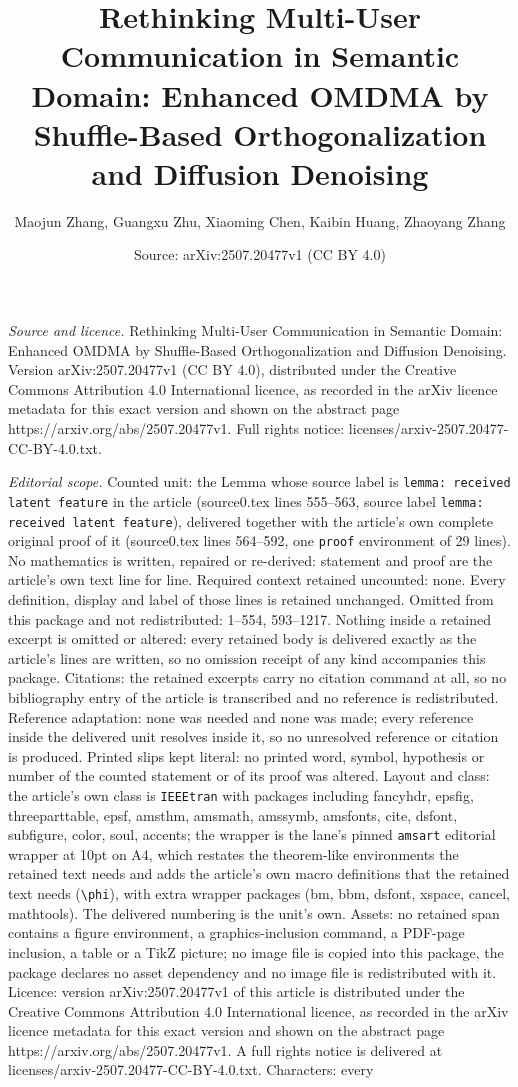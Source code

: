 \documentclass[10pt,a4paper]{amsart}
\title[Rethinking Multi-User Communication in Semantic Domain: Enha]{Rethinking Multi-User Communication in Semantic Domain: Enhanced OMDMA by Shuffle-Based Orthogonalization and Diffusion Denoising}
\author{Maojun Zhang, Guangxu Zhu, Xiaoming Chen, Kaibin Huang, Zhaoyang Zhang}
\date{Source: arXiv:2507.20477v1 (CC BY 4.0)}
\begin{document}
\maketitle

\noindent\emph{Source and licence.} Rethinking Multi-User Communication in Semantic Domain: Enhanced OMDMA by Shuffle-Based Orthogonalization and Diffusion Denoising. Version arXiv:2507.20477v1 (CC BY 4.0), distributed under the Creative Commons Attribution 4.0 International licence, as recorded in the arXiv licence metadata for this exact version and shown on the abstract page https://arxiv.org/abs/2507.20477v1. Full rights notice: licenses/arxiv-2507.20477-CC-BY-4.0.txt.\par\smallskip

\noindent\textit{Editorial scope.} Counted unit: the Lemma whose source label is \texttt{lemma: received latent feature} in the article (source0.tex lines 555--563, source label \texttt{lemma: received latent feature}), delivered together with the article's own complete original proof of it (source0.tex lines 564--592, one \texttt{proof} environment of 29 lines). No mathematics is written, repaired or re-derived: statement and proof are the article's own text line for line. Required context retained uncounted: none. Every definition, display and label of those lines is retained unchanged. Omitted from this package and not redistributed: 1--554, 593--1217. Nothing inside a retained excerpt is omitted or altered: every retained body is delivered exactly as the article's lines are written, so no omission receipt of any kind accompanies this package. Citations: the retained excerpts carry no citation command at all, so no bibliography entry of the article is transcribed and no reference is redistributed. Reference adaptation: none was needed and none was made; every reference inside the delivered unit resolves inside it, so no unresolved reference or citation is produced. Printed slips kept literal: no printed word, symbol, hypothesis or number of the counted statement or of its proof was altered. Layout and class: the article's own class is \texttt{IEEEtran} with packages including fancyhdr, epsfig, threeparttable, epsf, amsthm, amsmath, amssymb, amsfonts, cite, dsfont, subfigure, color, soul, accents; the wrapper is the lane's pinned \texttt{amsart} editorial wrapper at 10pt on A4, which restates the theorem-like environments the retained text needs and adds the article's own macro definitions that the retained text needs (\texttt{\textbackslash phi}), with extra wrapper packages (bm, bbm, dsfont, xspace, cancel, mathtools). The delivered numbering is the unit's own. Assets: no retained span contains a figure environment, a graphics-inclusion command, a PDF-page inclusion, a table or a TikZ picture; no image file is copied into this package, the package declares no asset dependency and no image file is redistributed with it. Licence: version arXiv:2507.20477v1 of this article is distributed under the Creative Commons Attribution 4.0 International licence, as recorded in the arXiv licence metadata for this exact version and shown on the abstract page https://arxiv.org/abs/2507.20477v1. A full rights notice is delivered at licenses/arxiv-2507.20477-CC-BY-4.0.txt. Characters: every 
\end{document}
